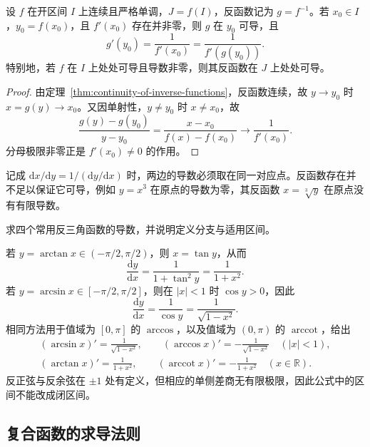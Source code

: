 \begin{theorem}
\label{thm:inverse-function-derivative}
设 $f$ 在开区间 $I$ 上连续且严格单调，$J=f(I)$，反函数记为 $g=f^{-1}$。若 $x_0\in I$，$y_0=f(x_0)$，且 $f'(x_0)$ 存在并非零，则 $g$ 在 $y_0$ 可导，且
\begin{equation}
\label{eq:inverse-function-derivative}
    g'(y_0)=\frac1{f'(x_0)}=\frac1{f'(g(y_0))}.
\end{equation}
特别地，若 $f$ 在 $I$ 上处处可导且导数非零，则其反函数在 $J$ 上处处可导。
\end{theorem}
\begin{proof}
由定理~\ref{thm:continuity-of-inverse-functions}，反函数连续，故 $y\to y_0$ 时 $x=g(y)\to x_0$。又因单射性，$y\ne y_0$ 时 $x\ne x_0$，故
\[
    \frac{g(y)-g(y_0)}{y-y_0}
    =\frac{x-x_0}{f(x)-f(x_0)}
    \longrightarrow\frac1{f'(x_0)}.
\]
分母极限非零正是 $f'(x_0)\ne0$ 的作用。
\end{proof}

记成 $\mathrm dx/\mathrm dy=1/(\mathrm dy/\mathrm dx)$ 时，两边的导数必须取在同一对应点。反函数存在并不足以保证它可导，例如 $y=x^3$ 在原点的导数为零，其反函数 $x=\sqrt[3]{y}$ 在原点没有有限导数。

\begin{example}
\label{ex:derivatives-of-inverse-trigonometric-functions}
求四个常用反三角函数的导数，并说明定义分支与适用区间。
\end{example}
\begin{solve}
若 $y=\arctan x\in(-\pi/2,\pi/2)$，则 $x=\tan y$，从而
\[
    \frac{\mathrm dy}{\mathrm dx}
    =\frac1{1+\tan^2y}=\frac1{1+x^2}.
\]
若 $y=\arcsin x\in[-\pi/2,\pi/2]$，则在 $|x|<1$ 时 $\cos y>0$，因此
\[
    \frac{\mathrm dy}{\mathrm dx}
    =\frac1{\cos y}=\frac1{\sqrt{1-x^2}}.
\]
相同方法用于值域为 $[0,\pi]$ 的 $\arccos$，以及值域为 $(0,\pi)$ 的 $\operatorname{arccot}$，给出
\begin{equation}
\label{eq:inverse-trigonometric-derivatives}
\begin{gathered}
    (\arcsin x)'=\frac1{\sqrt{1-x^2}},\qquad
    (\arccos x)'=-\frac1{\sqrt{1-x^2}}\quad(|x|<1),\\
    (\arctan x)'=\frac1{1+x^2},\qquad
    (\operatorname{arccot}x)'=-\frac1{1+x^2}\quad(x\in\mathbb R).
\end{gathered}
\end{equation}
反正弦与反余弦在 $\pm1$ 处有定义，但相应的单侧差商无有限极限，因此公式中的区间不能改成闭区间。
\end{solve}

\subsection{复合函数的求导法则}
\label{subsec:chain-rule}

